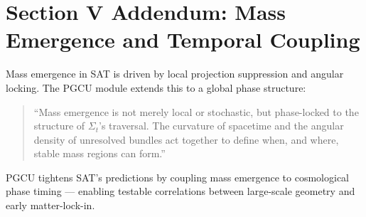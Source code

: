 \bigskip

\section*{Section V Addendum: Mass Emergence and Temporal Coupling}

Mass emergence in SAT is driven by local projection suppression and angular locking. The PGCU module extends this to a global phase structure:

\begin{quote}
``Mass emergence is not merely local or stochastic, but phase-locked to the structure of $\Sigma_t$’s traversal. The curvature of spacetime and the angular density of unresolved bundles act together to define when, and where, stable mass regions can form.''
\end{quote}

PGCU tightens SAT’s predictions by coupling mass emergence to cosmological phase timing — enabling testable correlations between large-scale geometry and early matter-lock-in.
